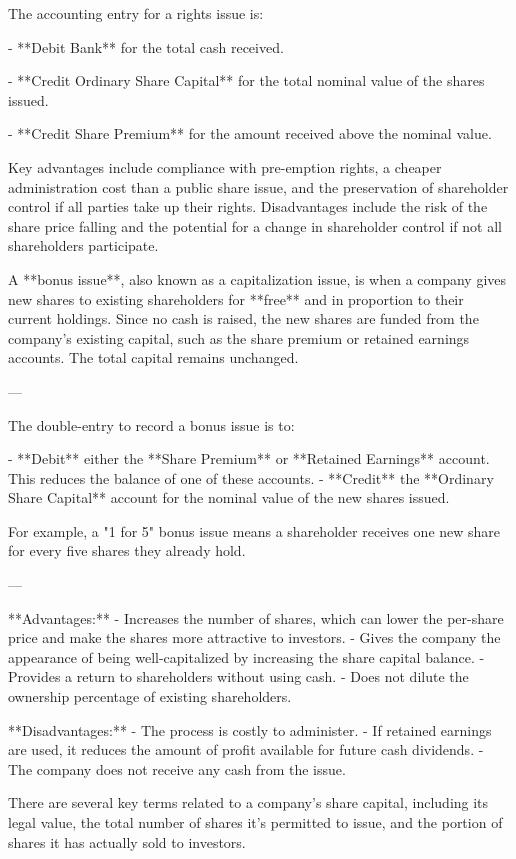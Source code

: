 The accounting entry for a rights issue is:

- **Debit Bank** for the total cash received.
    
- **Credit Ordinary Share Capital** for the total nominal value of the shares issued.
    
- **Credit Share Premium** for the amount received above the nominal value.
    

Key advantages include compliance with pre-emption rights, a cheaper administration cost than a public share issue, and the preservation of shareholder control if all parties take up their rights. Disadvantages include the risk of the share price falling and the potential for a change in shareholder control if not all shareholders participate.

A **bonus issue**, also known as a capitalization issue, is when a company gives new shares to existing shareholders for **free** and in proportion to their current holdings. Since no cash is raised, the new shares are funded from the company's existing capital, such as the share premium or retained earnings accounts. The total capital remains unchanged.

---

The double-entry to record a bonus issue is to:

- **Debit** either the **Share Premium** or **Retained Earnings** account. This reduces the balance of one of these accounts.
- **Credit** the **Ordinary Share Capital** account for the nominal value of the new shares issued.

For example, a "1 for 5" bonus issue means a shareholder receives one new share for every five shares they already hold.

---


**Advantages:**
- Increases the number of shares, which can lower the per-share price and make the shares more attractive to investors.
- Gives the company the appearance of being well-capitalized by increasing the share capital balance.
- Provides a return to shareholders without using cash.
- Does not dilute the ownership percentage of existing shareholders.

**Disadvantages:**
- The process is costly to administer.
- If retained earnings are used, it reduces the amount of profit available for future cash dividends.
- The company does not receive any cash from the issue.

There are several key terms related to a company's share capital, including its legal value, the total number of shares it's permitted to issue, and the portion of shares it has actually sold to investors.

